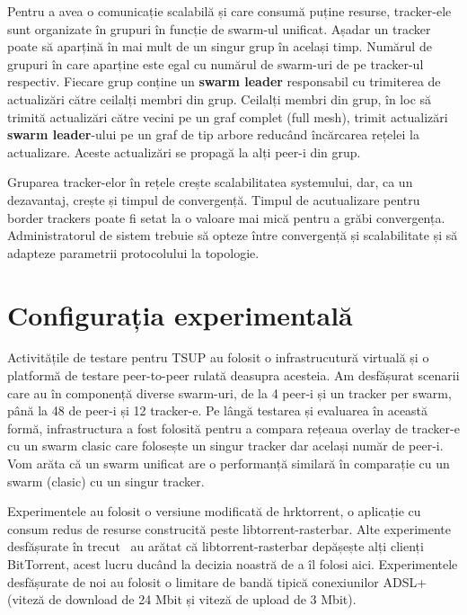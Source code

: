 Pentru a avea o comunicație scalabilă și care consumă puține resurse, tracker-ele sunt organizate în grupuri în funcție de swarm-ul unificat. Așadar un tracker poate să aparțină în mai mult de un singur grup în același timp. Numărul de grupuri în care aparține este egal cu numărul de swarm-uri de pe tracker-ul respectiv. Fiecare grup conține un \textbf{swarm leader} responsabil cu trimiterea de actualizări către ceilalți membri din grup. Ceilalți membri din grup, în loc să trimită actualizări către vecini pe un graf complet (full mesh), trimit actualizări \textbf{swarm leader}-ului pe un graf de tip arbore reducând încărcarea rețelei la actualizare. Aceste actualizări se propagă la alți peer-i din grup.

Gruparea tracker-elor în rețele crește scalabilitatea systemului, dar, ca un dezavantaj, crește și timpul de convergență. Timpul de acutualizare pentru border trackers poate fi setat la o valoare mai mică pentru a grăbi convergența. Administratorul de sistem trebuie să opteze între convergență și scalabilitate și să adapteze parametrii protocolului la topologie.

\section{Configurația experimentală}
\label{sec:unified-tracker:setup}

Activitățile de testare pentru TSUP au folosit o infrastrucutură virtuală și o platformă de testare peer-to-peer rulată deasupra acesteia. Am desfășurat scenarii care au în componență diverse swarm-uri, de la 4 peer-i și un tracker per swarm, până la 48 de peer-i și 12 tracker-e. Pe lângă testarea și evaluarea în această formă, infrastructura a fost folosită pentru a compara rețeaua overlay de tracker-e cu un swarm clasic care folosește un singur tracker dar același număr de peer-i. Vom arăta că un swarm unificat are o performanță similară în comparație cu un swarm (clasic) cu un singur tracker.

Experimentele au folosit o versiune modificată de hrktorrent, o aplicație cu consum redus de resurse construcită peste libtorrent-rasterbar. Alte experimente desfășurate în trecut~\cite{bt-vi} au arătat că libtorrent-rasterbar depășește alți clienți BitTorrent, acest lucru ducând la decizia noastră de a îl folosi aici. Experimentele desfășurate de noi au folosit o limitare de bandă tipică conexiunilor ADSL+ (viteză de download de 24 Mbit și viteză de upload de 3 Mbit).

